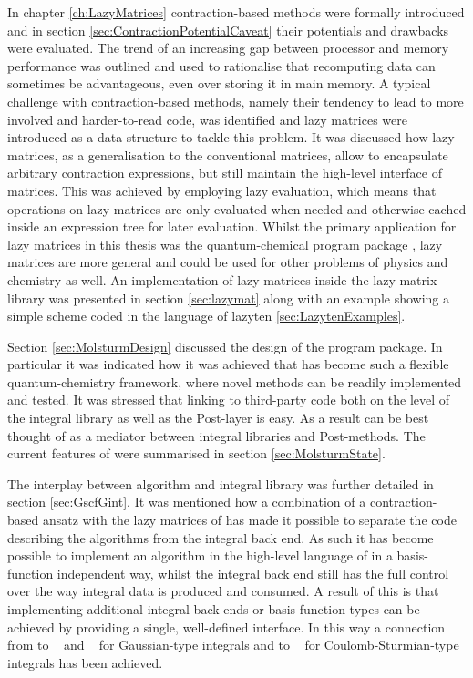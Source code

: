 In chapter \ref{ch:LazyMatrices} contraction-based methods
were formally introduced and in section \ref{sec:ContractionPotentialCaveat}
their potentials and drawbacks were evaluated.
The trend of an increasing gap between processor and memory performance
was outlined and used to rationalise that recomputing data
can sometimes be advantageous, even over storing it in main memory.
A typical challenge with contraction-based methods,
namely their tendency to lead to more involved and harder-to-read code,
was identified
and lazy matrices were introduced as a data structure
to tackle this problem.
It was discussed how lazy matrices, as a generalisation
to the conventional matrices,
allow to encapsulate arbitrary contraction expressions,
but still maintain the high-level interface of matrices.
This was achieved by employing lazy evaluation,
which means that operations on lazy matrices are only
evaluated when needed
and otherwise cached inside an expression tree for later evaluation.
Whilst the primary application for lazy matrices in this thesis was the quantum-chemical
program package \molsturm,
lazy matrices are more general and could be used for other problems
of physics and chemistry as well.
An implementation of lazy matrices inside the
lazy matrix library \lazyten was presented in section \ref{sec:lazymat}
along with an example showing a simple \SCF
scheme coded in the language of lazyten \ref{sec:LazytenExamples}.


Section \ref{sec:MolsturmDesign} discussed
the design of the \molsturm program package.
In particular it was indicated how it was achieved
that \molsturm has become such a flexible quantum-chemistry framework,
where novel methods
can be readily implemented and tested.
It was stressed that linking to third-party code
both on the level of the integral library as well
as the Post-\HF layer is easy.
As a result \molsturm can be best thought of as a mediator
between integral libraries and Post-\HF methods.
The current features of \molsturm
were summarised in section \ref{sec:MolsturmState}.

The interplay between \SCF algorithm and integral library
was further detailed in section \ref{sec:GscfGint}.
It was mentioned how a combination of a contraction-based \SCF ansatz
with the lazy matrices of \lazyten
has made it possible to separate the code describing
the \SCF algorithms from the integral back end.
As such it has become possible to implement
an \SCF algorithm in the high-level language of \lazyten
in a basis-function independent way,
whilst the integral back end still has the full
control over the way integral data is produced and consumed.
A result of this is that implementing
additional integral back ends or basis function types
can be achieved by providing a single,
well-defined interface.
In this way a connection from \molsturm
to \libint~\cite{Libint2_231,Libint2} and \libcint~\cite{Sun2015}
for Gaussian-type integrals
and to \sturmint~\cite{sturmintWeb}
for Coulomb-Sturmian-type integrals has been achieved.

